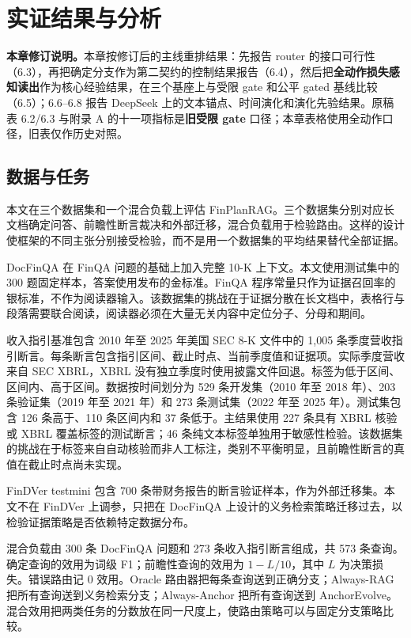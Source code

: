 \chapter{实证结果与分析}
\label{ch:empirical}

\begin{revbox}
\noindent\textbf{本章修订说明。}本章按修订后的主线重排结果：先报告 router 的接口可行性（6.3），再把确定分支作为第二契约的控制结果报告（6.4），然后把\textbf{全动作损失感知读出}作为核心经验结果，在三个基座上与受限 gate 和公平 gated 基线比较（6.5）；6.6--6.8 报告 DeepSeek 上的文本锚点、时间演化和演化先验结果。原稿表 6.2/6.3 与附录 A 的十一项指标是\textbf{旧受限 gate} 口径；本章表格使用全动作口径，旧表仅作历史对照。
\end{revbox}

\section{数据与任务}

本文在三个数据集和一个混合负载上评估 FinPlanRAG。三个数据集分别对应长文档确定问答、前瞻性断言裁决和外部迁移，混合负载用于检验路由。这样的设计使框架的不同主张分别接受检验，而不是用一个数据集的平均结果替代全部证据。

DocFinQA 在 FinQA 问题的基础上加入完整 10-K 上下文\citep{reddy2024docfinqa}。本文使用测试集中的 300 题固定样本，答案使用发布的金标准。FinQA 程序常量只作为证据召回率的银标准，不作为阅读器输入。该数据集的挑战在于证据分散在长文档中，表格行与段落需要联合阅读，阅读器必须在大量无关内容中定位分子、分母和期间。

收入指引基准包含 2010 年至 2025 年美国 SEC 8-K 文件中的 1,005 条季度营收指引断言。每条断言包含指引区间、截止时点、当前季度值和证据项。实际季度营收来自 SEC XBRL，XBRL 没有独立季度时使用披露文件回退。标签为低于区间、区间内、高于区间。数据按时间划分为 529 条开发集（2010 年至 2018 年）、203 条验证集（2019 年至 2021 年）和 273 条测试集（2022 年至 2025 年）。测试集包含 126 条高于、110 条区间内和 37 条低于。主结果使用 227 条具有 XBRL 核验或 XBRL 覆盖标签的测试断言；46 条纯文本标签单独用于敏感性检验。该数据集的挑战在于标签来自自动核验而非人工标注，类别不平衡明显，且前瞻性断言的真值在截止时点尚未实现。

FinDVer testmini 包含 700 条带财务报告的断言验证样本\citep{zhao2024findver}，作为外部迁移集。本文不在 FinDVer 上调参，只把在 DocFinQA 上设计的义务检索策略迁移过去，以检验证据策略是否依赖特定数据分布。

混合负载由 300 条 DocFinQA 问题和 273 条收入指引断言组成，共 573 条查询。确定查询的效用为词级 F1；前瞻性查询的效用为 $1-L/10$，其中 $L$ 为决策损失。错误路由记 0 效用。Oracle 路由器把每条查询送到正确分支；Always-RAG 把所有查询送到义务检索分支；Always-Anchor 把所有查询送到 AnchorEvolve。混合效用把两类任务的分数放在同一尺度上，使路由策略可以与固定分支策略比较。

